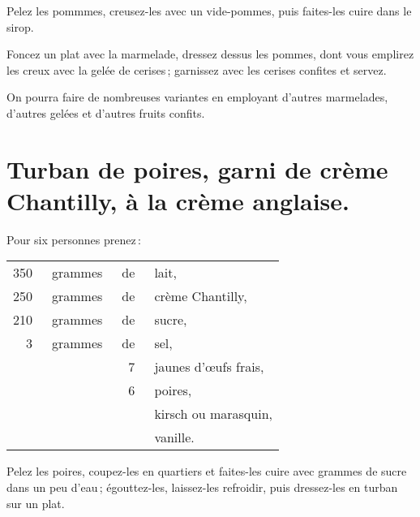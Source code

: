 Pelez les pommmes, creusez-les avec un vide-pommes, puis faites-les cuire dans
le sirop.

Foncez un plat avec la marmelade, dressez dessus les pommes, dont vous emplirez
les creux avec la gelée de cerises ; garnissez avec les cerises confites et
servez.

\sk

On pourra faire de nombreuses variantes en employant d'autres marmelades,
d'autres gelées et d'autres fruits confits.

\section*{\centering Turban de poires, garni de crème Chantilly, à la crème anglaise.}
{}

Pour six personnes prenez :

\footnotesize
\begin{longtable}{rrrp{16em}}
    350 & grammes & de & lait,                                                                            \\
    250 & grammes & de & crème Chantilly,                                                                 \\
    210 & grammes & de & sucre,                                                                           \\
      3 & grammes & de & sel,                                                                             \\
        &         &  7 & jaunes d'œufs frais,                                                             \\
        &         &  6 & poires,                                                                          \\
        &         &    & kirsch ou marasquin,                                                             \\
        &         &    & vanille.                                                                         \\
\end{longtable}
\normalsize

Pelez les poires, coupez-les en quartiers et faites-les cuire avec {\mmm}
grammes de sucre dans un peu d'eau ; égouttez-les, laissez-les refroidir, puis
dressez-les en turban sur un plat.

